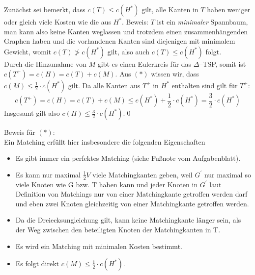 \documentclass[a4paper]{article}
\begin{document}
	\maketitle
	\section{}
		Zunächst sei bemerkt, dass $c(T)\leq c(H^*)$ gilt, alle Kanten in $T$ haben weniger oder gleich viele Kosten wie die aus $H^*$.\n
		Beweis: $T$ ist ein \textit{minimaler} Spannbaum, man kann also keine Kanten weglassen und trotzdem einen zusammenhängenden Graphen haben und die vorhandenen Kanten sind diejenigen mit minimalem Gewicht, womit $c(T)\not> c(H^*)$ gilt, also auch $c(T)\leq c(H^*)$ folgt.\\
		Durch die Hinzunahme von $M$ gibt es einen Eulerkreis für das $\Delta$--TSP, somit ist $c(T^+)=c(H)=c(T)+c(M)$.
		Aus $(*)$ wissen wir, dass $c(M)\leq \frac{1}{2}\cdot c(H^*)$ gilt.
		Da alle Kanten aus $T^+$ in $H^*$ enthalten sind gilt für $T^+$:
		\[c(T^+)=c(H)=c(T)+c(M)\leq c(H^*)+\frac{1}{2}\cdot c(H^*)=\frac{3}{2}\cdot c(H^*)\]
		Insgesamt gilt also $c(H)\leq \frac{3}{2}\cdot c(H^*)$.\qed
		
		Beweis für $(*)$: \\
		Ein Matching erfüllt hier insbesondere die folgenden Eigenschaften
		\begin{itemize}
		\item Es gibt immer ein perfektes Matching (siehe Fußnote vom Aufgabenblatt).
		\item Es kann nur maximal $\frac{1}{2}V$ viele Matchingkanten geben, weil $G^\prime$ nur maximal so viele Knoten wie G bzw. T haben kann und jeder Knoten in $G^\prime$ laut Definition von Matchings nur von einer Matchingkante getroffen werden darf und eben zwei Knoten gleichzeitig von einer Matchingkante getroffen werden.
		\item Da die Dreiecksungleichung gilt, kann keine Matchingkante länger sein, als der Weg zwischen den beteiligten Knoten der Matchingkanten in T. 
		\item Es wird ein Matching mit minimalen Kosten bestimmt.
		\item Es folgt direkt $c(M)\leq \frac{1}{2}\cdot c(H^*)$.
		\end{itemize}
		
\end{document}

